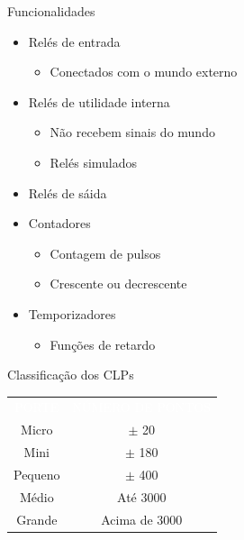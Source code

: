\documentclass[aspectratio=169,
				xcolor=table]{beamer}
\begin{document}
	\begin{frame}[allowframebreaks]{Funcionalidades}
		
		\begin{itemize}
			\item Relés de entrada
			\begin{itemize}
				\item Conectados com o mundo externo
			\end{itemize}
			\vspace{1em}
			\item Relés de utilidade interna
			\begin{itemize}
				\item Não recebem sinais do mundo
				\item Relés simulados
			\end{itemize}
			\vspace{1em}
			\item Relés de sáida
			\framebreak
			\item Contadores
			\begin{itemize}
				\item Contagem de pulsos
				\item Crescente ou decrescente
			\end{itemize}
			\vspace{1em}
			\item Temporizadores
			\begin{itemize}
				\item Funções de retardo
			\end{itemize}
		\end{itemize}
	\end{frame}

	\begin{frame}{Classificação dos CLPs}
		\begin{eftable}
			\begin{tabular}{c||c}
			\textcolor{white}{PORTE} & \textcolor{white}{NÚMERO DE PONTOS} \\ 
			Micro & $\pm$ 20 \\ 
			Mini & $\pm$ 180 \\ 
			Pequeno & $\pm$ 400 \\
			Médio & Até 3000 \\ 
			Grande & Acima de 3000 \\ 
			\end{tabular} 
		
		\end{eftable}
	\end{frame}
\end{document}
